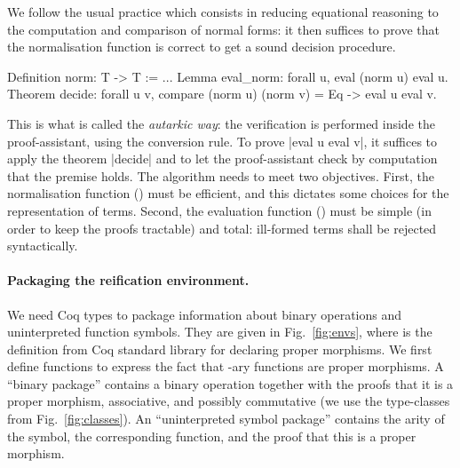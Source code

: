 \documentclass{llncs}
\begin{document}
We follow the usual practice which consists in reducing equational
reasoning to the computation and comparison of normal forms: it then
suffices to prove that the normalisation function is correct to get a
sound decision procedure.
\begin{twolistings}
\begin{coq}
Definition norm: T -> T := ...
Lemma eval_norm: forall u, eval (norm u) \equiv eval u.
Theorem decide: forall u v, compare (norm u) (norm v) = Eq -> eval u \equiv eval v.
\end{coq}
\end{twolistings}
\noindent
This is what is called the \emph{autarkic way}: the verification is
performed inside the proof-assistant, using the conversion rule. To
prove \coqinline|eval u \equiv eval v|, it suffices to apply the
theorem \coqinline|decide| and to let the proof-assistant check by
computation that the premise holds.
The algorithm needs to meet two objectives. First, the normalisation
function () must be efficient, and this dictates some
choices for the representation of terms. Second, the evaluation
function () must be simple (in order to keep the proofs
tractable) and total: ill-formed terms shall be rejected
syntactically.

\paragraph{Packaging the reification environment.}

We need Coq types to package information about binary operations and
uninterpreted function symbols. They are given in Fig.~\ref{fig:envs},
where  is the definition from Coq standard
library for declaring proper morphisms. We first define functions to
express the fact that -ary functions are proper morphisms. A
``binary package'' contains a binary operation together with the
proofs that it is a proper morphism, associative, and possibly
commutative (we use the type-classes from Fig.~\ref{fig:classes}). An
``uninterpreted symbol package'' contains the arity of the symbol, the
corresponding function, and the proof that this is a proper morphism.
\end{document}

